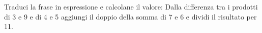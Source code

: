 \item Traduci la frase in espressione e calcolane il valore: Dalla differenza tra i prodotti di 3 e 9 e di 4 e 5 aggiungi il doppio della somma di 7 e 6 e dividi il risultato per 11.